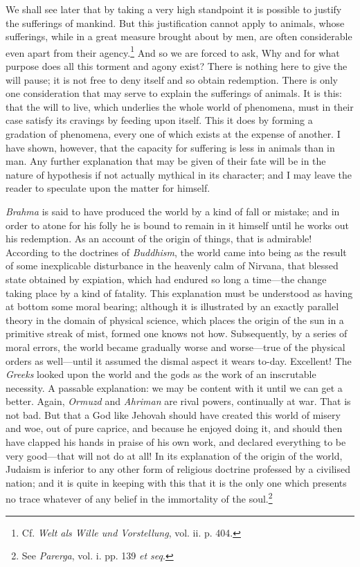 We shall see later that by taking a very high standpoint it is
possible to justify the sufferings of  mankind. But this
justification cannot apply to animals, whose sufferings, while in a
great measure brought about by men, are often considerable even apart
from their agency.\footnote{Cf. \textit{Welt als Wille und
Vorstellung}, vol. ii. p. 404.} And so we are forced to ask, Why and
for what purpose does all this torment and agony exist? There is
nothing here to give the will pause; it is not free to deny itself
and so obtain redemption. There is only one consideration that may
serve to explain the sufferings of animals. It is this: that the will
to live, which underlies the whole world of phenomena, must in their
case satisfy its cravings by feeding upon itself. This it does by
forming a gradation of phenomena, every one of which exists at the
expense of another. I have shown, however, that the capacity for
suffering is less in animals than in man. Any further explanation that
may be given of their fate will be in the nature of hypothesis if not
actually mythical in its character; and I may leave the reader to
speculate upon the matter for himself.

\vspace{1\baselineskip}

\textit{Brahma} is said to have produced the world by a kind of fall
or mistake; and in order to atone for his folly he is bound to remain
in it himself until he works out his redemption. As an account of the
origin of things, that is admirable! According to the doctrines of
\textit{Buddhism}, the world came into being as the result of some
inexplicable disturbance in the heavenly calm of Nirvana, that blessed
state obtained by expiation, which had endured so long a time---the
change taking place by a kind of fatality. This  explanation
must be understood as having at bottom some moral bearing; although it
is illustrated by an exactly parallel theory in the domain of physical
science, which places the origin of the sun in a primitive streak of
mist, formed one knows not how. Subsequently, by a series of moral
errors, the world became gradually worse and worse---true of the
physical orders as well---until it assumed the dismal aspect it wears
to-day. Excellent! The \textit{Greeks} looked upon the world and the
gods as the work of an inscrutable necessity. A passable explanation:
we may be content with it until we can get a better. Again,
\textit{Ormuzd} and \textit{Ahriman} are rival powers, continually at
war. That is not bad. But that a God like Jehovah should have created
this world of misery and woe, out of pure caprice, and because he
enjoyed doing it, and should then have clapped his hands in praise of
his own work, and declared everything to be very good---that will not
do at all! In its explanation of the origin of the world, Judaism is
inferior to any other form of religious doctrine professed by a
civilised nation; and it is quite in keeping with this that it is the
only one which presents no trace whatever of any belief in the
immortality of the soul.\footnote{See \textit{Parerga}, vol. i. pp.
139 \textit{et seq}.}

